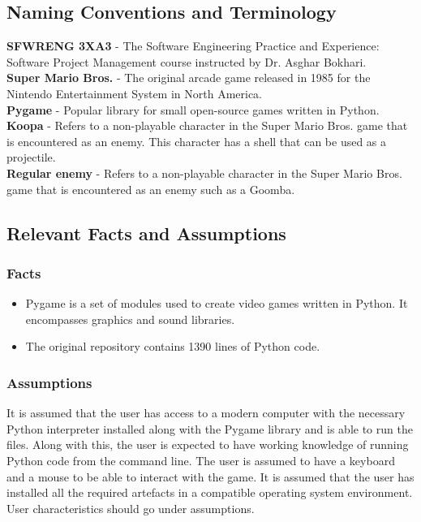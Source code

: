 \documentclass[12pt, titlepage]{article}
\begin{document}
\subsection{Naming Conventions and Terminology}
    \textbf{SFWRENG 3XA3} - The Software Engineering Practice and Experience: Software Project Management course instructed by Dr. Asghar Bokhari.\\
    \textbf{Super Mario Bros.} - The original arcade game released in 1985 for the Nintendo Entertainment System in North America.\\
    \textbf{Pygame} - Popular library for small open-source games written in Python.\\
    \textbf{Koopa} - Refers to a non-playable character in the Super Mario Bros. game that is encountered as an enemy. This character has a shell that can be used as a projectile.\\
    \textbf{Regular enemy} - Refers to a non-playable character in the Super Mario Bros. game that is encountered as an enemy such as a Goomba.\\
\subsection{Relevant Facts and Assumptions}
    \subsubsection{Facts}
    \begin{itemize}
        \item Pygame is a set of modules used to create video games written in Python. It encompasses graphics and sound libraries.
        \item The original repository contains 1390 lines of Python code.
    \end{itemize}
    \subsubsection{Assumptions}
    It is assumed that the user has access to a modern computer with the necessary Python interpreter installed along with the Pygame library and is able to run the files. Along with this, the user is expected to have working knowledge of running Python code from the command line. The user is assumed to have a keyboard and a mouse to be able to interact with the game. It is assumed that the user has installed all the required artefacts in a compatible operating system environment.
User characteristics should go under assumptions.
\end{document}
